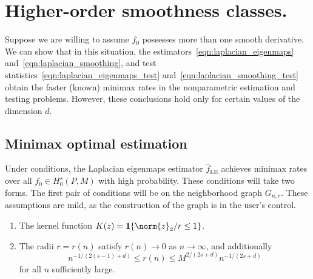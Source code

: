 \documentclass{article}
\newcommand{\1}{\mathbf{1}}
\newcommand{\wh}[1]{\widehat{#1}}
\newcommand{\LE}{\mathrm{LE}}
\theoremstyle{alden}
\theoremstyle{aldenthm}
\theoremstyle{definition}
\theoremstyle{remark}
\begin{document}
\section{Higher-order smoothness classes.}
\label{sec:higher_order_smoothness_classes}
Suppose we are willing to assume $f_0$ possesses more than one smooth derivative. We can show that in this situation, the estimators~\eqref{eqn:laplacian_eigenmaps} and~\eqref{eqn:laplacian_smoothing}, and test statistics~\eqref{eqn:laplacian_eigenmaps_test} and~\eqref{eqn:laplacian_smoothing_test} obtain the faster (known) minimax rates in the nonparametric estimation and testing problems. However, these conclusions hold only for certain values of the dimension $d$. 

\subsection{Minimax optimal estimation}
Under  conditions, the Laplacian eigenmaps estimator $\wh{f}_{\LE}$ achieves minimax rates over all $f_0 \in H_0^s(P,M)$ with high probability. These conditions will take two forms. The first pair of conditions will be on the neighborhood graph $G_{n,r}$. These assumptions are mild, as the construction of the graph is in the user's control.
\begin{enumerate}[label=(K\arabic*)]
	\item 
	\label{asmp:kernel_form}
	The kernel function $K(z) = \1\{\norm{z}_2/r \leq 1 \}$.
	\item 
	\label{asmp:kernel_radius}
	The radii $r = r(n)$ satisfy $r(n) \to 0$ as $n \to \infty$, and additionally
	\begin{equation*}
	n^{-1/(2(s - 1) + d)}\leq r(n) \leq M^{2/(2s + d)}n^{-1/(2s + d)}
	\end{equation*}
	for all $n$ sufficiently large.
\end{enumerate}
\end{document}
